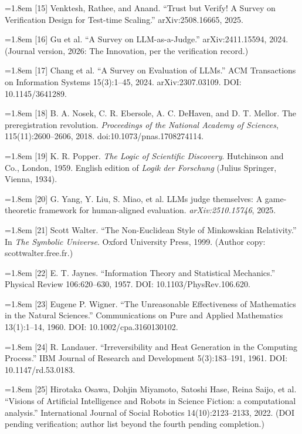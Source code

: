 \documentclass[11pt]{article}
\begin{document}
\noindent\hangindent=1.8em [15] Venktesh, Rathee, and Anand. ``Trust but Verify! A Survey on Verification Design for Test-time Scaling.'' arXiv:2508.16665, 2025.\par\medskip
\noindent\hangindent=1.8em [16] Gu et al. ``A Survey on LLM-as-a-Judge.'' arXiv:2411.15594, 2024. (Journal version, 2026: The Innovation, per the verification record.)\par\medskip
\noindent\hangindent=1.8em [17] Chang et al. ``A Survey on Evaluation of LLMs.'' ACM Transactions on Information Systems 15(3):1–45, 2024. arXiv:2307.03109. DOI: 10.1145/3641289.\par\medskip
\noindent\hangindent=1.8em [18] B. A. Nosek, C. R. Ebersole, A. C. DeHaven, and D. T. Mellor. The preregistration revolution. \emph{Proceedings of the National Academy of Sciences}, 115(11):2600–2606, 2018. doi:10.1073/pnas.1708274114.\par\medskip
\noindent\hangindent=1.8em [19] K. R. Popper. \emph{The Logic of Scientific Discovery}. Hutchinson and Co., London, 1959. English edition of \emph{Logik der Forschung} (Julius Springer, Vienna, 1934).\par\medskip
\noindent\hangindent=1.8em [20] G. Yang, Y. Liu, S. Miao, et al. LLMs judge themselves: A game-theoretic framework for human-aligned evaluation. \emph{arXiv:2510.15746}, 2025.\par\medskip
\noindent\hangindent=1.8em [21] Scott Walter. ``The Non-Euclidean Style of Minkowskian Relativity.'' In \emph{The Symbolic Universe}. Oxford University Press, 1999. (Author copy: scottwalter.free.fr.)\par\medskip
\noindent\hangindent=1.8em [22] E. T. Jaynes. ``Information Theory and Statistical Mechanics.'' Physical Review 106:620–630, 1957. DOI: 10.1103/PhysRev.106.620.\par\medskip
\noindent\hangindent=1.8em [23] Eugene P. Wigner. ``The Unreasonable Effectiveness of Mathematics in the Natural Sciences.'' Communications on Pure and Applied Mathematics 13(1):1–14, 1960. DOI: 10.1002/cpa.3160130102.\par\medskip
\noindent\hangindent=1.8em [24] R. Landauer. ``Irreversibility and Heat Generation in the Computing Process.'' IBM Journal of Research and Development 5(3):183–191, 1961. DOI: 10.1147/rd.53.0183.\par\medskip
\noindent\hangindent=1.8em [25] Hirotaka Osawa, Dohjin Miyamoto, Satoshi Hase, Reina Saijo, et al. ``Visions of Artificial Intelligence and Robots in Science Fiction: a computational analysis.'' International Journal of Social Robotics 14(10):2123–2133, 2022. (DOI pending verification; author list beyond the fourth pending completion.)\par\medskip
\end{document}
